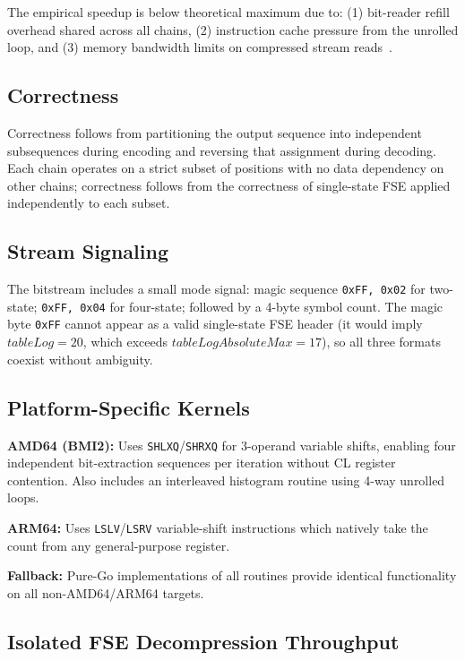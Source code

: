 \documentclass[journal]{IEEEtran}
\begin{document}
The empirical speedup is below theoretical maximum due to: (1) bit-reader
refill overhead shared across all chains, (2) instruction cache pressure from
the unrolled loop, and (3) memory bandwidth limits on compressed stream
reads~\cite{williams2009}.

\subsection{Correctness}

Correctness follows from partitioning the output sequence into independent
subsequences during encoding and reversing that assignment during decoding.
Each chain operates on a strict subset of positions with no data dependency on
other chains; correctness follows from the correctness of single-state FSE
applied independently to each subset.

\subsection{Stream Signaling}

The bitstream includes a small mode signal: magic sequence \texttt{0xFF,
0x02} for two-state; \texttt{0xFF, 0x04} for four-state; followed by a 4-byte
symbol count. The magic byte \texttt{0xFF} cannot appear as a valid single-state
FSE header (it would imply $\textit{tableLog} = 20$, which exceeds
$\textit{tableLogAbsoluteMax} = 17$), so all three formats coexist without
ambiguity.

\subsection{Platform-Specific Kernels}

\textbf{AMD64 (BMI2):} Uses \texttt{SHLXQ}/\texttt{SHRXQ} for 3-operand
variable shifts, enabling four independent bit-extraction sequences per
iteration without CL register contention. Also includes an interleaved
histogram routine using 4-way unrolled loops.

\textbf{ARM64:} Uses \texttt{LSLV}/\texttt{LSRV} variable-shift instructions
which natively take the count from any general-purpose register.

\textbf{Fallback:} Pure-Go implementations of all routines provide identical
functionality on all non-AMD64/ARM64 targets.

\subsection{Isolated FSE Decompression Throughput}
\end{document}
